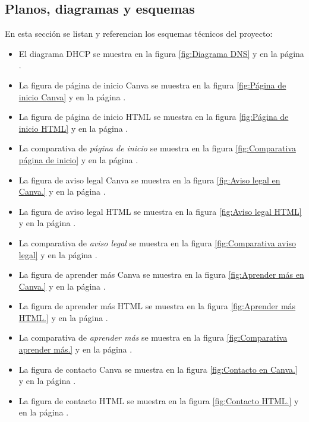\documentclass[11.5pt]{article}
\begin{document}
	\subsection{Planos, diagramas y esquemas}
	
	En esta sección se listan y referencian los esquemas técnicos del proyecto:
	
	\begin{itemize}
		\item El diagrama DHCP se muestra en la figura \ref{fig:Diagrama DNS} y en la página \pageref{fig:Diagrama DNS}.
		\item La figura de página de inicio Canva se muestra en la figura \ref{fig:Página de inicio Canva} y en la página \pageref{fig:Página de inicio Canva}.
		\item La figura de página de inicio HTML se muestra en la figura \ref{fig:Página de inicio HTML} y en la página \pageref{fig:Página de inicio HTML}.
		\item La comparativa de \textit{página de inicio} se muestra en la figura \ref{fig:Comparativa página de inicio} y en la página \pageref{fig:Comparativa página de inicio}.
		\item La figura de aviso legal Canva se muestra en la figura \ref{fig:Aviso legal en Canva.} y en la página \pageref{fig:Aviso legal en Canva.}.
		\item La figura de aviso legal HTML se muestra en la figura \ref{fig:Aviso legal HTML} y en la página \pageref{fig:Aviso legal HTML}.
		\item La comparativa de \textit{aviso legal} se muestra en la figura \ref{fig:Comparativa aviso legal} y en la página \pageref {fig:Comparativa aviso legal}.
		\item La figura de aprender más Canva se muestra en la figura \ref{fig:Aprender más en Canva.} y en la página \pageref{fig:Aprender más en Canva.}.
		\item La figura de aprender más HTML se muestra en la figura \ref{fig:Aprender más HTML.} y en la página \pageref{fig:Aprender más HTML.}.
		\item La comparativa de \textit{aprender más} se muestra en la figura \ref{fig:Comparativa aprender más.} y en la página \pageref {fig:Comparativa aprender más.}.
		\item La figura de contacto Canva se muestra en la figura \ref{fig:Contacto en Canva.} y en la página \pageref{fig:Contacto en Canva.}.
		\item La figura de contacto HTML se muestra en la figura \ref{fig:Contacto HTML.} y en la página \pageref{fig:Contacto HTML.}.

\end{itemize}
\end{document}
